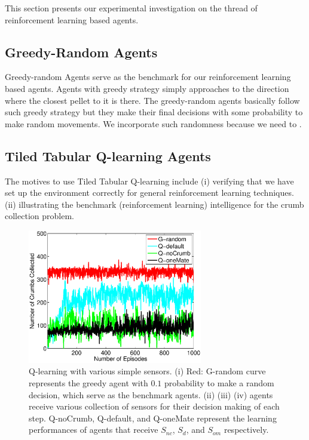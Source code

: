 \documentclass[conference]{IEEEtran}
\begin{document}
This section presents our experimental investigation on the thread of reinforcement
learning based agents.

\subsection{Greedy-Random Agents} 
Greedy-random Agents serve as the benchmark for our reinforcement
learning based agents.
Agents with greedy strategy simply approaches to the direction where the
closest pellet to it is there.
The greedy-random agents basically follow such greedy strategy but they make
their final decisions with some probability to make random movements. 
We incorporate such randomness because we need to .

\subsection{Tiled Tabular Q-learning Agents}
The motives to use Tiled Tabular Q-learning include
(i) verifying that we have set up the environment correctly for general
reinforcement learning techniques. 
(ii) illustrating the benchmark (reinforcement learning) intelligence for the
crumb collection problem.

\begin{figure}[!t]
\centering
\includegraphics[width=3.0in]{./figures/RL/init_setup1.eps}
\caption{Q-learning with various simple sensors. (i) Red: G-random curve
    represents the greedy agent with $0.1$ probability to make a random
    decision, which serve as the benchmark agents. 
    (ii) (iii) (iv) agents receive various collection of sensors for their
    decision making of each step. Q-noCrumb, Q-default, and Q-oneMate
    represent the learning performances of agents that receive $S_{nc}$,
    $S_{d}$, and $S_{om}$ respectively.
} 
\label{fig:RL_init}
\end{figure}
\end{document}
